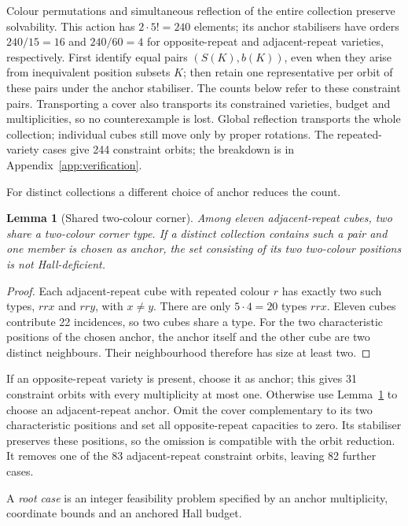 \documentclass[11pt]{article}
\newtheorem{lemma}[theorem]{Lemma}
\theoremstyle{remark}
\begin{document}
Colour permutations and simultaneous reflection of the entire collection
preserve solvability. This action has $2\cdot5!=240$ elements; its anchor
stabilisers have orders $240/15=16$ and $240/60=4$ for opposite-repeat and
adjacent-repeat varieties, respectively. First identify equal pairs $(S(K),b(K))$, even when
they arise from inequivalent position subsets $K$; then retain one
representative per orbit of these pairs under the anchor stabiliser.
The counts below refer to these constraint pairs. Transporting a cover
also transports its constrained varieties, budget and multiplicities, so
no counterexample is lost. Global reflection transports the whole
collection; individual cubes still move only by proper rotations.
The repeated-variety cases give 244 constraint orbits; the breakdown is in
Appendix~\ref{app:verification}.

For distinct collections a different choice of anchor reduces the count.
\begin{lemma}[Shared two-colour corner]\label{lem:shared}
Among eleven adjacent-repeat cubes, two share a two-colour corner type.
If a distinct collection contains such a pair and one member is chosen as
anchor, the set consisting of its two two-colour positions is not
Hall-deficient.
\end{lemma}
\begin{proof}
Each adjacent-repeat cube with repeated colour $r$ has exactly two such
types, $rrx$ and $rry$, with $x\ne y$. There are only $5\cdot4=20$ types $rrx$. Eleven cubes contribute
22 incidences, so two cubes share a type. For the two characteristic positions
of the chosen anchor, the anchor itself and the other cube are two distinct
neighbours. Their neighbourhood therefore has size at least two.
\end{proof}
If an opposite-repeat variety is present, choose it as anchor; this gives
31 constraint orbits with every multiplicity at most one. Otherwise use
Lemma~\ref{lem:shared} to choose an adjacent-repeat anchor. Omit the cover
complementary to its two characteristic positions and set all opposite-repeat
capacities to zero. Its stabiliser preserves these positions, so the omission
is compatible with the orbit reduction. It removes one of the 83
adjacent-repeat constraint orbits, leaving 82 further cases.

A \emph{root case} is an integer feasibility problem specified by an anchor
multiplicity, coordinate bounds and an anchored Hall budget.
\end{document}
